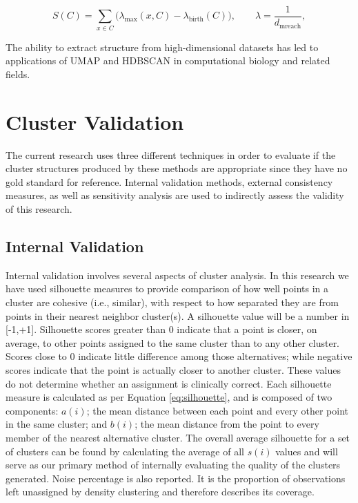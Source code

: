 \begin{equation}\label{eq:hdbscan_stab}
S(C)=\sum_{x\in C}\bigl(\lambda_{\max}(x,C)-\lambda_{\mathrm{birth}}(C)\bigr),\qquad \lambda=\frac{1}{d_{\mathrm{mreach}}},
\end{equation}

The ability to extract structure from high-dimensional datasets has led to applications of UMAP and HDBSCAN in computational biology and related fields.

\section{Cluster Validation}
The current research uses three different techniques in order to evaluate if the cluster structures produced by these methods are appropriate since they have no gold standard for reference. Internal validation methods, external consistency measures, as well as sensitivity analysis are used to indirectly assess the validity of this research.

\subsection{Internal Validation}
Internal validation involves several aspects of cluster analysis. In this research we have used silhouette measures \parencite{rousseeuw1987silhouettes} to provide comparison of how well points in a cluster are cohesive (i.e., similar), with respect to how separated they are from points in their nearest neighbor cluster(s). A silhouette value will be a number in [-1,+1]. Silhouette scores greater than 0 indicate that a point is closer, on average, to other points assigned to the same cluster than to any other cluster. Scores close to 0 indicate little difference among those alternatives; while negative scores indicate that the point is actually closer to another cluster. These values do not determine whether an assignment is clinically correct. Each silhouette measure is calculated as per Equation \ref{eq:silhouette}, and is composed of two components: \(a(i)\); the mean distance between each point and every other point in the same cluster; and \(b(i)\); the mean distance from the point to every member of the nearest alternative cluster. The overall average silhouette for a set of clusters can be found by calculating the average of all \(s(i)\) values and will serve as our primary method of internally evaluating the quality of the clusters generated. Noise percentage is also reported. It is the proportion of observations left unassigned by density clustering and therefore describes its coverage.

